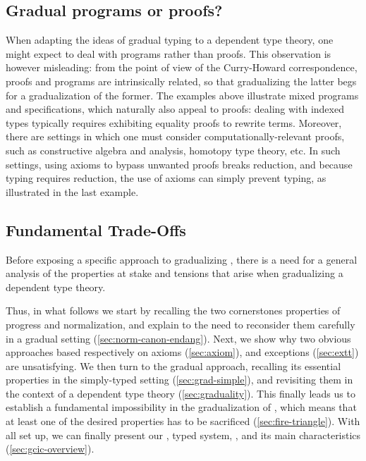 \subsection{Gradual programs or proofs?}

When adapting the ideas of gradual typing to a dependent type theory, one might
expect to deal with programs rather than proofs.
This observation is however misleading: from the point of view of the Curry-Howard correspondence, proofs and programs are intrinsically related, so that gradualizing the latter begs for a gradualization of the former. The examples above illustrate mixed programs and specifications, which naturally also appeal to proofs: dealing with indexed types typically requires exhibiting equality proofs to rewrite terms.
Moreover, there are settings in which one must consider computationally-relevant proofs, such as constructive algebra and analysis, homotopy type theory, etc. In such settings, using axioms to bypass unwanted proofs breaks reduction, and because typing requires reduction, the use of axioms can simply prevent typing, as illustrated in the last example.

\subsection{Fundamental Trade-Offs}

Before exposing a specific approach to gradualizing ,
there is a need for a general analysis of the properties at stake and tensions
that arise when gradualizing a dependent type theory.

Thus, in what follows
we start by recalling the two cornerstones properties of progress and normalization,
and explain to the need to reconsider them carefully in a gradual setting
(\cref{sec:norm-canon-endang}).
Next, we show why two obvious approaches based respectively on axioms (\cref{sec:axiom}),
and exceptions (\cref{sec:extt}) are unsatisfying.
We then turn to the gradual approach, recalling its essential properties in the simply-typed
setting (\cref{sec:grad-simple}),
and revisiting them in the context of a dependent type theory (\cref{sec:graduality}).
This finally leads us to establish a fundamental impossibility in the gradualization
of , which means that at least one of the desired properties has to be sacrificed (\cref{sec:fire-triangle}).
With all set up, we can finally present our ,
 typed system, , and its main characteristics
(\cref{sec:gcic-overview}).

